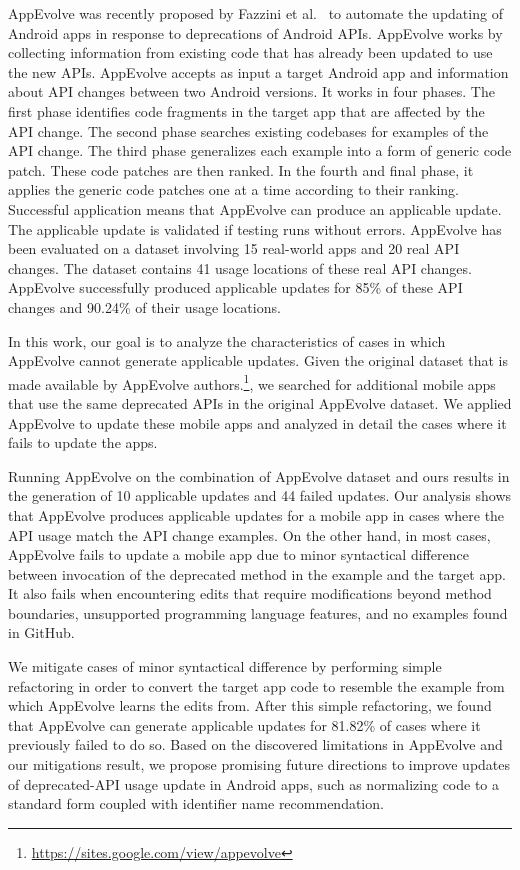 AppEvolve was recently proposed by Fazzini et al.~\cite{fazzini2019automated} to
automate the updating of Android apps in response to deprecations of
Android APIs.  AppEvolve works by collecting information from existing code
that has already been updated to use the new APIs. 
AppEvolve accepts as input a target Android app and information about API changes between two Android versions. It works in four phases. The first phase identifies code fragments in the target app that are affected by the API change. The second phase searches existing codebases for examples of the API change. The third phase generalizes each example into a form of generic code patch. These code patches are then ranked. In the fourth and final phase, it applies the generic code patches one at a time according to their ranking. Successful application means that AppEvolve can produce an applicable  update. The applicable update is validated if testing runs without errors. AppEvolve has been evaluated on a dataset involving 15 real-world apps and 20 real API changes. The dataset contains 41 usage locations of these real API changes. AppEvolve successfully produced applicable updates for 85\% of these API changes and 90.24\% of their usage locations. 

In this work, our goal is to analyze the characteristics of cases in which AppEvolve cannot generate applicable updates. Given the original dataset that is made available by AppEvolve authors.\footnote{\url{https://sites.google.com/view/appevolve}}, we searched for additional mobile apps that use the same deprecated APIs in the original AppEvolve dataset. We applied AppEvolve to update these mobile apps and analyzed in detail the cases where it fails to update the apps.

Running AppEvolve on the combination of AppEvolve dataset and ours results in the generation of 10 applicable updates and 44 failed updates. Our analysis shows that AppEvolve produces applicable updates for a mobile app in cases where the API usage match the API change examples.  On the other hand, in most cases, AppEvolve fails to update a mobile app due to minor syntactical difference between invocation of the deprecated method in the example and the target app. It also fails when encountering edits that require modifications beyond method boundaries, unsupported programming language features, and no examples found in GitHub.

We mitigate cases of minor syntactical difference by performing simple refactoring in order to convert the target app code to resemble the example from which AppEvolve learns the edits from. After this simple refactoring, we found that AppEvolve can generate applicable updates for 81.82\% of cases where it previously failed to do so. Based on the discovered limitations in AppEvolve and our mitigations result, we propose promising future directions to improve updates of deprecated-API usage update in Android apps, such as normalizing code to a standard form coupled with identifier name recommendation.

